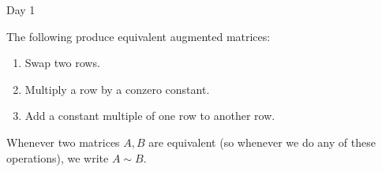 \begin{applicationActivities}{Day 1}

\begin{definition}
  The following  produce equivalent
  augmented matrices:
  \begin{enumerate}
    \item Swap two rows.
    \item Multiply a row by a conzero constant.
    \item Add a constant multiple of one row to another row.
  \end{enumerate}
  Whenever two matrices \(A,B\) are equivalent (so whenever we do any of
  these operations), we write \(A\sim B\).
\end{definition}


\end{applicationActivities}
